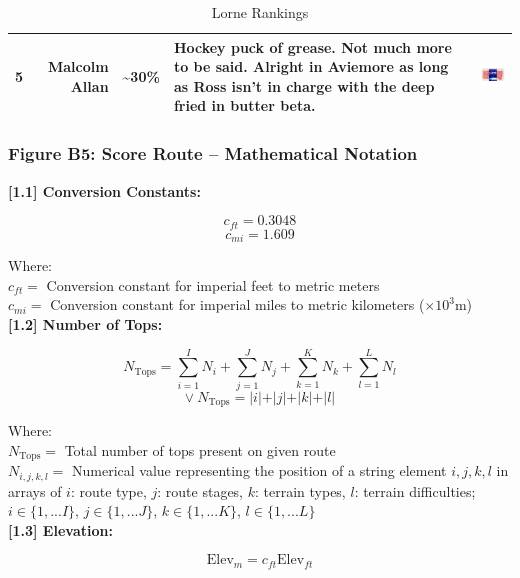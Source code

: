 \documentclass[11pt, english]{article}
\begin{document}
\begin{table}[h]
\begin{center}
\begin{tabular}{rr|p{1.25cm}p{3.5cm}p{2.5cm}}
			5 & Malcolm Allan & \textasciitilde30\% & Hockey puck of grease. Not much more to be said. Alright in Aviemore as long as Ross isn't in charge with the deep fried in butter beta. & \vspace{-0.25cm}\includegraphics[width=2.5cm]{../System/Photos/ma_lorne.jpg}\\
			\hline
		\end{tabular}
			\caption{Lorne Rankings}
		\end{center}
		\end{table}

\newpage

		\subsubsection*{Figure B5: Score Route -- Mathematical Notation}

	\textbf{[1.1] Conversion Constants:}

	$$c_{ft}=0.3048$$
	$$c_{mi}=1.609$$

	Where:\\
	$c_{ft}=$ Conversion constant for imperial feet to metric meters\\
	$c_{mi}=$ Conversion constant for imperial miles to metric kilometers ($\times10^{3}$m)\\

	\textbf{[1.2] Number of Tops:}

	$$N_{\mathrm{Tops}}=\sum^{I}_{i=1}N_{i}+\sum^{J}_{j=1}N_{j}+\sum^{K}_{k=1}N_{k}+\sum^{L}_{l=1}N_{l}$$
	$$\lor\ N_{\mathrm{Tops}}=\vert i\vert + \vert j\vert + \vert k\vert + \vert l\vert$$

	Where:\\
	$N_{\mathrm{Tops}}=$ Total number of tops present on given route\\
	$N_{i,j,k,l}=$ Numerical value representing the position of a string element $i,j,k,l$ in arrays of $i$: route type, $j$: route stages, $k$: terrain types, $l$: terrain difficulties; $i\in\{1,...I\}$, $j\in\{1,...J\}$, $k\in\{1,...K\}$, $l\in\{1,...L\}$\\

	\textbf{[1.3] Elevation:}

	$$\mathrm{Elev}_{m}=c_{ft}\mathrm{Elev}_{ft}$$
\end{document}
